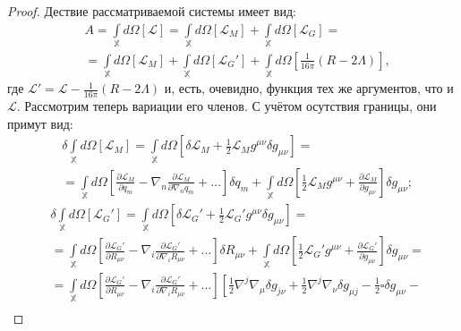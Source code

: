 \documentclass[a4paper, 14pt]{scrarticle}
\theoremstyle{Imperial}
\begin{document}
	\begin{proof}
		Дествие рассматриваемой системы имеет вид:
		$$\begin{aligned} 
			&A = \int\limits_\mathbb{X} d\Omega \left[ \mathcal{L} \right] = \int\limits_\mathbb{X} d\Omega \left[ \mathcal{L}_M \right] + \int\limits_\mathbb{X} d\Omega \left[ \mathcal{L}_G \right] =\\
			&= \int\limits_\mathbb{X} d\Omega \left[ \mathcal{L}_M \right] + \int\limits_\mathbb{X} d\Omega \left[ \mathcal{L}_G' \right] + \int\limits_\mathbb{X} d\Omega \left[ \frac{1}{16\pi} \left( R -2\Lambda \right)  \right],
		\end{aligned}$$
		где $\mathcal{L}' = \mathcal{L} - \frac{1}{16\pi} \left( R -2\Lambda \right)$ и, есть, очевидно, функция тех же аргументов, что и $\mathcal{L}$.
		Рассмотрим теперь вариации его членов. С учётом осутствия границы, они примут вид:
		$$\begin{aligned}
			&\delta\int\limits_\mathbb{X} d\Omega \left[ \mathcal{L}_M \right] = \int\limits_\mathbb{X} d\Omega \left[ \delta \mathcal{L}_M + \frac{1}{2} \mathcal{L}_M g^{\mu\nu} \delta g_{\mu\nu} \right] =\\
			&= \int\limits_\mathbb{X} d\Omega \left[ \frac{\partial \mathcal{L}_M}{\partial q_m} - \nabla_n \frac{\partial \mathcal{L}_M}{\partial \nabla_n q_m} + \dots \right] \delta q_m + \int\limits_\mathbb{X} d\Omega \left[ \frac{1}{2} \mathcal{L}_M g^{\mu\nu} + \frac{\partial\mathcal{L}_M}{\partial g_{\mu\nu}} \right] \delta g_{\mu\nu};
		\end{aligned}$$
		$$\begin{aligned}
			&\delta\int\limits_\mathbb{X} d\Omega \left[ \mathcal{L}_G' \right] = \int\limits_\mathbb{X} d\Omega \left[ \delta \mathcal{L}_G' + \frac{1}{2} \mathcal{L}_G' g^{\mu\nu} \delta g_{\mu\nu} \right] =\\
			&= \int\limits_\mathbb{X} d\Omega \left[ \frac{\partial \mathcal{L}_G'}{\partial R_{\mu\nu}} - \nabla_i \frac{\partial \mathcal{L}_G'}{\partial \nabla_i R_{\mu\nu}} + \dots \right] \delta R_{\mu\nu} + \int\limits_\mathbb{X} d\Omega \left[ \frac{1}{2} \mathcal{L}_G' g^{\mu\nu} + \frac{\partial\mathcal{L}_G'}{\partial g_{\mu\nu}} \right] \delta g_{\mu\nu} =\\
			&= \int\limits_\mathbb{X} d\Omega \left[ \frac{\partial \mathcal{L}_G'}{\partial R_{\mu\nu}} - \nabla_i \frac{\partial \mathcal{L}_G'}{\partial \nabla_i R_{\mu\nu}} + \dots \right] \left[ \frac{1}{2}\nabla^{j}\nabla_{\mu}\delta g_{j\nu}+\frac{1}{2}\nabla^{j}\nabla_{\nu}\delta g_{\mu j}-\frac{1}{2}\square\delta g_{\mu\nu}-\right.\\

\end{aligned}$$
\end{proof}
\end{document}
